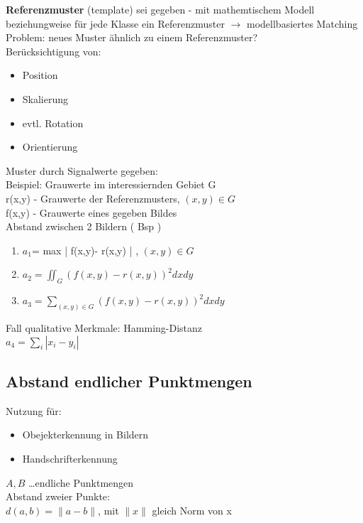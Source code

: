 \documentclass[a4paper,12pt]{scrreprt}
\begin{document}
  \textbf{Referenzmuster} (template) sei gegeben - mit mathemtischem Modell\\
  beziehungweise für jede Klasse ein Referenzmuster $\rightarrow$ modellbasiertes Matching\\
  Problem: neues Muster ähnlich zu einem Referenzmuster?\\
  Berücksichtigung von:
  \begin{itemize}
   \item Position
   \item Skalierung
   \item evtl. Rotation
   \item Orientierung
  \end{itemize}
  Muster durch Signalwerte gegeben:\\
  Beispiel: Grauwerte im interessiernden Gebiet G\\
  r(x,y) - Grauwerte der Referenzmusters, $(x,y) \in G$\\
  f(x,y) - Grauwerte eines gegeben Bildes\\
  Abstand zwischen 2 Bildern ( Bsp )\\
  \begin{enumerate}[]
   \item $a_1$= max | f(x,y)- r(x,y) | , $(x,y) \in G$
   \item $ a_2 =  \iint_G ( f(x,y) - r (x,y) )^2 dx dy $\\
   \item $ a_3 = \sum_{(x,y) \in G} ( f(x,y) - r (x,y) )^2 dx dy $\\
  \end{enumerate}
Fall qualitative Merkmale: Hamming-Distanz\\
$a_4 = \sum_i | x_i - y_i | $\\
    
    \subsection{Abstand endlicher Punktmengen}
    
    Nutzung für:
\begin{itemize}
 \item Obejekterkennung in Bildern
 \item Handschrifterkennung
\end{itemize}

$A, B$ \dots endliche Punktmengen\\
Abstand zweier Punkte:\\ $d(a,b)=\|a-b\|$, mit $\|x\|$ gleich Norm von x
\end{document}
